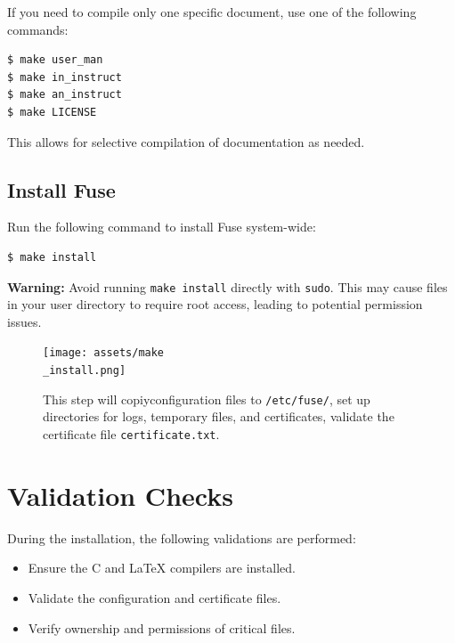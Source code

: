 \documentclass[a4paper,12pt]{article}
\begin{document}
\newpage

If you need to compile only one specific document, use one of the following commands:
\begin{lstlisting}[language=bash]
$ make user_man
$ make in_instruct
$ make an_instruct
$ make LICENSE
\end{lstlisting}
This allows for selective compilation of documentation as needed.

\subsection{Install Fuse}
Run the following command to install Fuse system-wide:
\begin{lstlisting}[language=bash]
$ make install
\end{lstlisting}
\textbf{Warning:} Avoid running \texttt{make install} directly with \texttt{sudo}. This may cause files in your user directory to require root access, leading to potential permission issues.
\begin{figure}[h]
	\centering
	\texttt{[image: assets/make\\\_install.png]}
	\caption{This step will copiyconfiguration files to \texttt{/etc/fuse/}, set up directories for logs, temporary files, and certificates, validate the certificate file \texttt{certificate.txt}.}
\end{figure}


\section{Validation Checks}
During the installation, the following validations are performed:
\begin{itemize}
	\item Ensure the C and LaTeX compilers are installed.
	\item Validate the configuration and certificate files.
	\item Verify ownership and permissions of critical files.
\end{itemize}

\newpage
\end{document}

